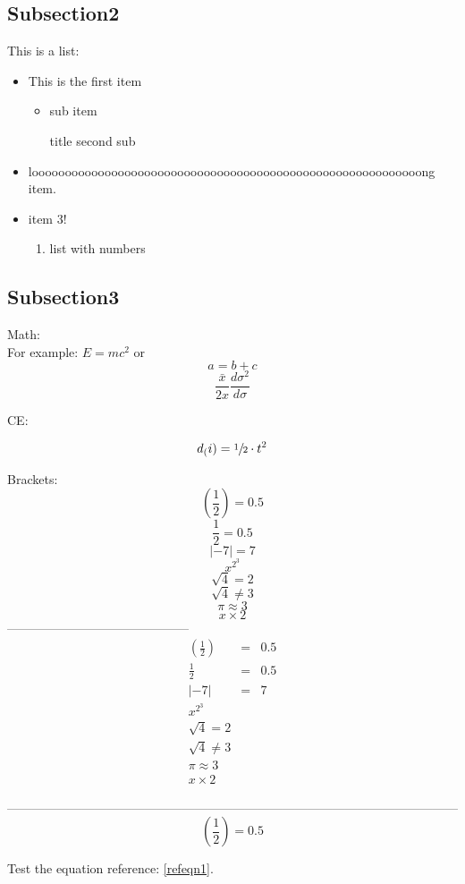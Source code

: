 \documentclass{article}
\begin{document}
\renewcommand{\labelitemi}{$\bullet$}
\renewcommand{\labelitemii}{$\diamond$}
\renewcommand{\labelitemiii}{$\circ$}

\subsection{Subsection2}
This is a list:
\begin{itemize}
	\item This is the first item
	\begin{itemize}
		\item sub item
		\item[title] second sub
	\end{itemize}
	\item looooooooooooooooooooooooooooooooooooooooooooooooooooooooooong item.
	\item item 3!
	  \begin{enumerate}
	  	\item list with numbers
	  \end{enumerate}
\end{itemize}

\subsection{Subsection3}
Math:\\
For example: $E=mc^2$ or $$a = b + c $$ 
$$\frac{\bar{x}}{2\hat{x}}\frac{d\sigma^2}{d\sigma}$$

CE:

$$d_(i) = \sfrac{1}{2}\cdot t ^2 $$

Brackets:\\
$$\left( \frac{1}{2} \right) = 0.5 $$
$$ { \frac{1}{2}} = 0.5 $$
$$ \left|-7 \right| = 7 $$
$$ x^{2^3} $$
$$ \sqrt{4} =2 $$
$$ \sqrt{4} \neq 3 $$
$$ \pi \approx 3 $$ 
$$ x \times 2 $$
--------------------------------------------
\begin{eqnarray*}
	\left( \frac{1}{2} \right) &=& 0.5 \\
	 { \frac{1}{2}} &=& 0.5 \\
	\left|-7 \right| &=&  7 \\
	 x^{2^3} \\
	\sqrt{4} =2 \\
	\sqrt{4} \neq 3 \\
	 \pi \approx 3 \\
	x \times 2 
\end{eqnarray*}


————————————————————————————————————
\begin{equation}\label{refeqn1}
\left( \frac{1}{2} \right) = 0.5 
\end{equation}

Test the equation reference: \ref{refeqn1}.

\cleardoublepage


	 
\end{document}

